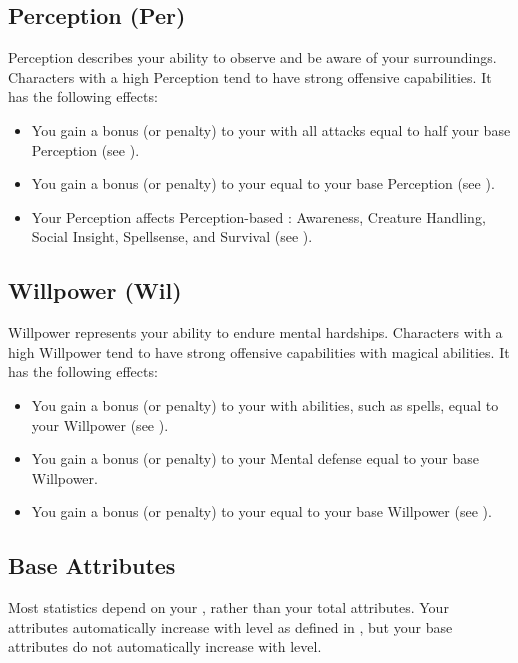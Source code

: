     \subsection{Perception (Per)}\label{Perception}
        {
            Perception describes your ability to observe and be aware of your surroundings.
            Characters with a high Perception tend to have strong offensive capabilities.
            It has the following effects:
            \begin{itemize}
                \item You gain a bonus (or penalty) to your  with all attacks equal to half your base Perception (see ).
                \item You gain a bonus (or penalty) to your  equal to your base Perception (see ).
                \item Your Perception affects Perception-based : Awareness, Creature Handling, Social Insight, Spellsense, and Survival (see ).
            \end{itemize}
        }

    \subsection{Willpower (Wil)}\label{Willpower}
        {
            Willpower represents your ability to endure mental hardships.
            Characters with a high Willpower tend to have strong offensive capabilities with magical abilities.
            It has the following effects:
            \begin{itemize}
                \item You gain a bonus (or penalty) to your  with  abilities, such as spells, equal to your Willpower (see ).
                \item You gain a bonus (or penalty) to your Mental defense equal to your base Willpower.
                \item You gain a bonus (or penalty) to your  equal to your base Willpower (see ).
            \end{itemize}
        }

    \subsection{Base Attributes}\label{Base Attributes}
        Most statistics depend on your , rather than your total attributes.
        Your attributes automatically increase with level as defined in , but your base attributes do not automatically increase with level.

